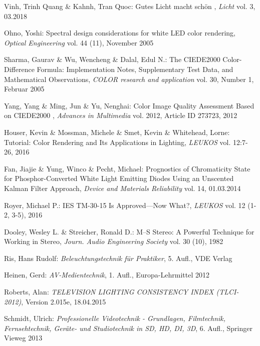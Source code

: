 \begin{thebibliography}{}
Vinh, Trinh Quang \& Kahnh, Tran Quoc:
\glqq Gutes Licht macht schön \grqq, 
\emph{Licht} vol. 3, 03.2018

Ohno, Yoshi:
\glqq Spectral design considerations for white LED color rendering\grqq, 
\emph{Optical Engineering} vol. 44 (11), November 2005

Sharma, Gaurav \& Wu, Wencheng \& Dalal, Edul N.:
\glqq The CIEDE2000 Color-Difference Formula: Implementation Notes, Supplementary Test Data, and Mathematical Observations\grqq,
\emph{COLOR research and application} vol. 30, Number 1, Februar 2005

Yang, Yang \& Ming, Jun \& Yu, Nenghai:
\glqq Color Image Quality Assessment Based on CIEDE2000 \grqq,
\emph{Advances in Multimedia} vol. 2012, Article ID 273723, 2012

Houser, Kevin \& Mossman, Michele \& Smet, Kevin \& Whitehead, Lorne:
\glqq Tutorial: Color Rendering and Its Applications in
Lighting\grqq, 
\emph{LEUKOS} vol. 12:7-26, 2016

Fan, Jiajie \& Yung, Winco \& Pecht, Michael:
\glqq Prognostics of Chromaticity State for Phosphor-Converted White Light Emitting Diodes Using an Unscented Kalman Filter Approach\grqq, 
\emph{Device and Materials Reliability} vol. 14, 01.03.2014

Royer, Michael P.:
\glqq IES TM-30-15 Is Approved—Now What?\grqq, 
\emph{LEUKOS} vol. 12 (1-2, 3-5), 2016


Dooley, Wesley L.  \& Streicher, Ronald D.:
\glqq M--S Stereo: A Powerful Technique for Working in Stereo\grqq, 
\emph{Journ. Audio Engineering Society} vol. 30 (10), 1982

Ris, Hans Rudolf: 
\emph{Beleuchtungstechnik für Praktiker}, 5. Aufl., VDE Verlag

Heinen, Gerd: 
\emph{AV-Medientechnik}, 1. Aufl., Europa-Lehrmittel 2012

Roberts, Alan: 
\emph{TELEVISION LIGHTING CONSISTENCY INDEX (TLCI-2012)}, Version 2.015e, 18.04.2015

Schmidt, Ulrich: 
\emph{Professionelle Videotechnik - Grundlagen, Filmtechnik, Fernsehtechnik, Geräte- und Studiotechnik in SD, HD, DI, 3D}, 6. Aufl., Springer Vieweg 2013


\end{thebibliography}
